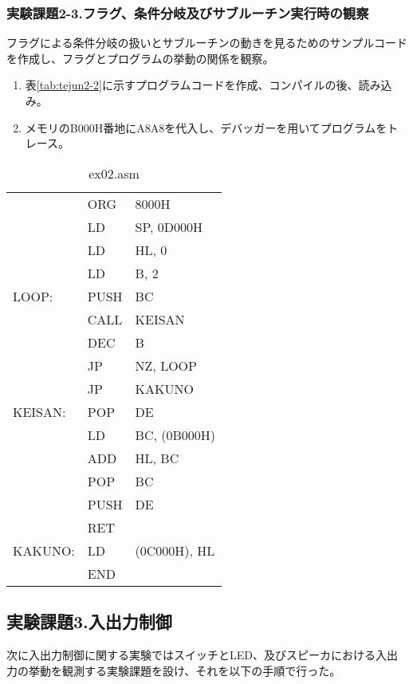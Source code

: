 \documentclass[11pt,a4j]{jsarticle}
\begin{document}
   
   
   \subsubsection{実験課題2-3.フラグ、条件分岐及びサブルーチン実行時の観察}
   フラグによる条件分岐の扱いとサブルーチンの動きを見るためのサンプルコードを作成し、フラグとプログラムの挙動の関係を観察。
   \begin{enumerate}
   \item 表\ref{tab:tejun2-2}に示すプログラムコードを作成、コンパイルの後、読み込み。
   \item メモリのB000H番地にA8A8を代入し、デバッガーを用いてプログラムをトレース。
   \end{enumerate}
   
   
   \begin{table}[htb]
  \begin{center}
    \caption{ex02.asm}
    \begin{tabular}{|lll|} \hline
 & ORG & 8000H \\
 & LD & SP, 0D000H \\
 & LD & HL, 0 \\
 & LD & B, 2 \\
LOOP: & PUSH & BC \\
 & CALL & KEISAN \\
 & DEC & B \\
 & JP & NZ, LOOP \\
 & JP & KAKUNO \\
KEISAN: & POP & DE \\
 & LD & BC, (0B000H) \\
 & ADD & HL, BC \\
 & POP & BC \\
 & PUSH & DE \\
 & RET &  \\
KAKUNO: & LD & (0C000H), HL \\
 & END &  \\ \hline
    \end{tabular}
    \label{tab:tejun2-3}
  \end{center}
 \end{table}
   
   
  \subsection{実験課題3.入出力制御}
  次に入出力制御に関する実験ではスイッチとLED、及びスピーカにおける入出力の挙動を観測する実験課題を設け、それを以下の手順で行った。
\end{document}
